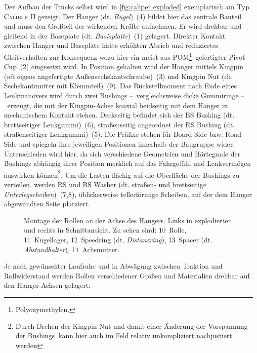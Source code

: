 		Der Aufbau der Trucks selbst wird in \cref{fig:caliper exploded} exemplarisch am Typ \textsc{Caliber II} gezeigt.
		Der Hanger (dt. \textit{Bügel})~(4) bildet hier das zentrale Bauteil und muss den Großteil der wirkenden Kräfte aufnehmen.
		Er wird drehbar und gleitend in der Baseplate (dt. \textit{Basisplatte})~(1) gelagert.
		Direkter Kontakt zwischen Hanger und Baseplate hätte erhöhten Abrieb und reduziertes Gleitverhalten zur Konsequenz wozu hier ein meist aus POM\footnote{\hspace{1mm} Polyoxymethylen.}~gefertigter Pivot Cup~(2) eingesetzt wird.
		In Position gehalten wird der Hanger mittels Kingpin (oft eigens angefertigte Außensechskantschraube)~(3) und Kingpin Nut (dt. Sechskantmutter mit Klemmteil)~(9).
		Das Rückstellmoment nach Ende eines Lenkmanövers wird durch zwei Bushings --~vergleichsweise dicke Gummiringe --~erzeugt, die mit der Kingpin-Achse koaxial beidseitig mit dem Hanger in mechanischem Kontakt stehen.
		Deckseitig befindet sich der BS Bushing (dt. brettseitiger Lenkgummi)~(6), straßenseitig angeordnet der RS Bushing (dt. straßenseitiger Lenkgummi)~(5).
		Die Präfixe stehen für Board Side bzw. Road Side und spiegeln ihre jeweiligen Positionen innerhalb der Baugruppe wider.
		Unterschieden wird hier, da sich verschiedene Geometrien und Härtegrade der Bushings abhängig ihrer Position merklich auf das Fahrgefühl und Lenkvermögen auswirken können\footnote{\hspace{1mm} Durch Drehen der Kingpin Nut und damit einer Änderung der Vorspannung der Bushings~kann hier auch im Feld relativ unkompliziert nachjustiert werden}.
		Um die Lasten flächig auf die Oberfläche der Bushings zu verteilen, werden RS und BS Washer (dt. straßen- und brettseitige \textit{Unterlegscheiben})~(7,8), üblicherweise tellerförmige Scheiben, auf der dem Hanger abgewandten Seite platziert.\par\medskip
		\begin{figure}[h]
			\centering
			
			\caption[Montage der Rollen an der Achse des Hanger]{Montage der Rollen an der Achse des Hangers. Links in explodierter und rechts in Schnittansicht. Zu sehen sind: 10~Rolle, 11~Kugellager, 12~Speedring (dt. \textit{Distanzring}), 13~Spacer (dt. \textit{Abstandhalter}), 14~Achsmutter.}\label{fig:wheel NT exploded}
		\end{figure}
		Je nach gewünschter Laufruhe und in Abwägung zwischen Traktion und Rollwiderstand werden Rollen verschiedener Größen und Materialien drehbar auf den Hanger-Achsen gelagert.
